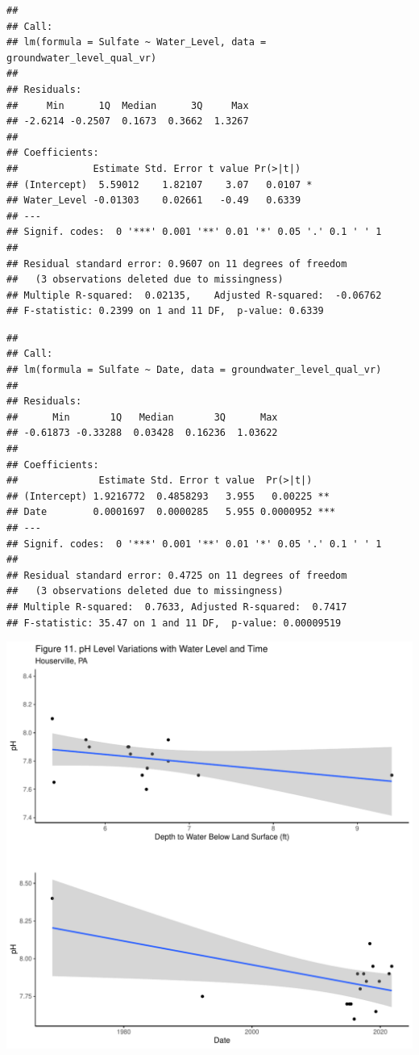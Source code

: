 \documentclass[
  12pt,
]{article}
\begin{document}
\newpage

\begin{verbatim}
## 
## Call:
## lm(formula = Sulfate ~ Water_Level, data = groundwater_level_qual_vr)
## 
## Residuals:
##     Min      1Q  Median      3Q     Max 
## -2.6214 -0.2507  0.1673  0.3662  1.3267 
## 
## Coefficients:
##             Estimate Std. Error t value Pr(>|t|)  
## (Intercept)  5.59012    1.82107    3.07   0.0107 *
## Water_Level -0.01303    0.02661   -0.49   0.6339  
## ---
## Signif. codes:  0 '***' 0.001 '**' 0.01 '*' 0.05 '.' 0.1 ' ' 1
## 
## Residual standard error: 0.9607 on 11 degrees of freedom
##   (3 observations deleted due to missingness)
## Multiple R-squared:  0.02135,    Adjusted R-squared:  -0.06762 
## F-statistic: 0.2399 on 1 and 11 DF,  p-value: 0.6339
\end{verbatim}

\begin{verbatim}
## 
## Call:
## lm(formula = Sulfate ~ Date, data = groundwater_level_qual_vr)
## 
## Residuals:
##      Min       1Q   Median       3Q      Max 
## -0.61873 -0.33288  0.03428  0.16236  1.03622 
## 
## Coefficients:
##              Estimate Std. Error t value  Pr(>|t|)    
## (Intercept) 1.9216772  0.4858293   3.955   0.00225 ** 
## Date        0.0001697  0.0000285   5.955 0.0000952 ***
## ---
## Signif. codes:  0 '***' 0.001 '**' 0.01 '*' 0.05 '.' 0.1 ' ' 1
## 
## Residual standard error: 0.4725 on 11 degrees of freedom
##   (3 observations deleted due to missingness)
## Multiple R-squared:  0.7633, Adjusted R-squared:  0.7417 
## F-statistic: 35.47 on 1 and 11 DF,  p-value: 0.00009519
\end{verbatim}

\newpage

\includegraphics{Elliott_WDA_Project_files/figure-latex/linear_m4-1.pdf}
\end{document}
